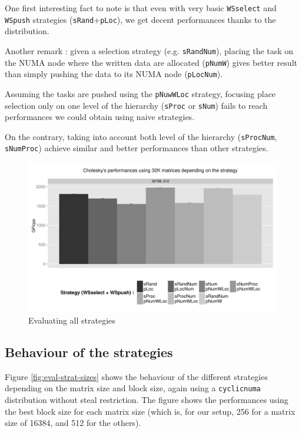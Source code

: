 \documentclass{Styles/llncs}
\begin{document}
One first interesting fact to note is that even with very basic \verb/WSselect/
and \verb/WSpush/ strategies (\verb/sRand/+\verb/pLoc/), we get decent performances
thanks to the distribution.

Another remark : given a selection strategy (e.g. \verb/sRandNum/), placing
the task on the NUMA node where the written data are allocated (\verb/pNumW/) gives
better result than simply pushing the data to its NUMA node (\verb/pLocNum/).

Assuming the tasks are pushed using the \verb/pNuwWLoc/ strategy, focusing
place selection only on one level of the hierarchy (\verb/sProc/ or \verb/sNum/)
fails to reach performances we could obtain using naive strategies.

On the contrary, taking into account both level of the hierarchy (\verb/sProcNum/,
\verb/sNumProc/) achieve similar and better performances than other strategies.



\begin{figure}[t]
  \centering
  \includegraphics[scale=0.5]{figures/graph_all_strat.pdf}
\caption{Evaluating all strategies}
\label{fig:eval-all-strat}
\end{figure}


\subsection{Behaviour of the strategies}

Figure \ref{fig:eval-strat-sizes} shows the behaviour of the different strategies
depending on the matrix size and block size, again using a \verb/cyclicnuma/ distribution
without steal restriction. The figure shows the performances using
the best block size for each matrix size (which is, for our setup, 256 for a matrix
size of 16384, and 512 for the others).
\end{document}
